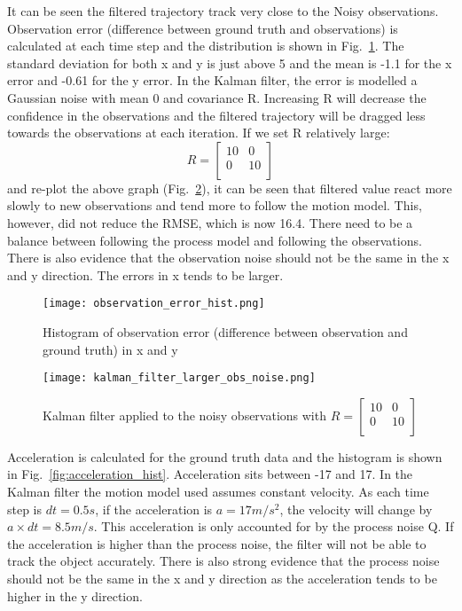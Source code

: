 \documentclass{report}
\begin{document}
It can be seen the filtered trajectory track very close to the Noisy observations. 
Observation error (difference between ground truth and observations) is calculated at each time step and the distribution is shown in Fig.~\ref{fig:observation_error_hist}. The standard deviation for both x and y is just above 5 and the mean is -1.1 for the x error and -0.61 for the y error. In the Kalman filter, the error is modelled a Gaussian noise with mean 0 and covariance R. Increasing R will decrease the confidence in the observations and the filtered trajectory will be dragged less towards the observations at each iteration. If we set R relatively large:
\[R = \begin{bmatrix} 
    10 & 0 \\
    0 & 10 \\
\end{bmatrix}\]
and re-plot the above graph (Fig.~\ref{fig:kalman_filter_larger_obs_noise}), it can be seen that filtered value react more slowly to new observations and tend more to follow the motion model. This, however, did not reduce the RMSE, which is now 16.4. There need to be a balance between following the process model and following the observations. There is also evidence that the observation noise should not be the same in the x and y direction. The errors in x tends to be larger.


\begin{figure}[ht]
    \centering
    \texttt{[image: observation\_error\_hist.png]}
    \caption{Histogram of observation error (difference between observation and ground truth) in x and y}
    \label{fig:observation_error_hist}
\end{figure}

\begin{figure}[ht]
    \centering
    \texttt{[image: kalman\_filter\_larger\_obs\_noise.png]}
    \caption{Kalman filter applied to the noisy observations with \(R = \begin{bmatrix} 
        10 & 0 \\
        0 & 10 \\
    \end{bmatrix}\)}
    \label{fig:kalman_filter_larger_obs_noise}
\end{figure}

Acceleration is calculated for the ground truth data and the histogram is shown in Fig.~\ref{fig:acceleration_hist}. Acceleration sits between -17 and 17. In the Kalman filter the motion model used assumes constant velocity. As each time step is \(dt=0.5s\), if the acceleration is \(a = 17 m/s^2\), the velocity will change by \(a \times dt = 8.5m/s\). This acceleration is only accounted for by the process noise Q. If the acceleration is higher than the process noise, the filter will not be able to track the object accurately. There is also strong evidence that the process noise should not be the same in the x and y direction as the acceleration tends to be higher in the y direction.
\end{document}
